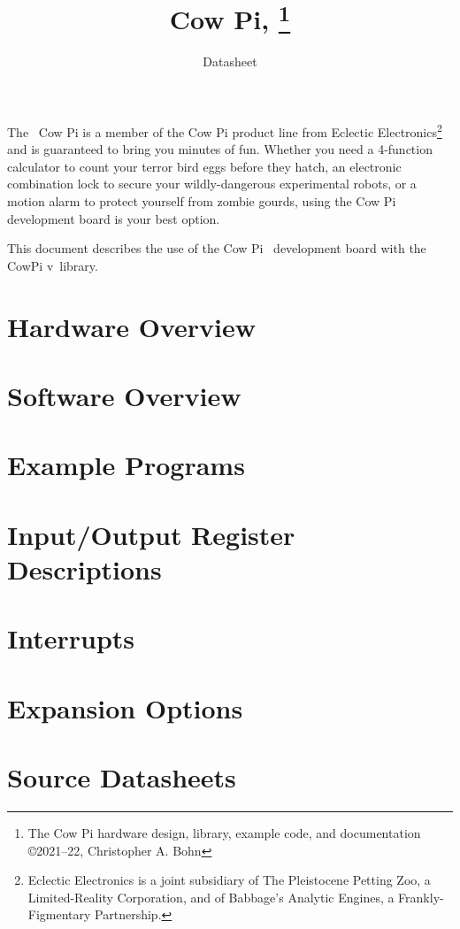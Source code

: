 \documentclass[12pt]{article}
\begin{document}
    \pagestyle{fancy}
    \fancyhf{}
    \cfoot{\thepage}
    \title{Cow Pi, \hardwareversion\footnote{The Cow Pi hardware design, library, example code, and documentation \copyright 2021--22, Christopher A. Bohn}}
    \author{Datasheet}
    \date{}
    \maketitle

    The \hardwareversion\ Cow Pi is a member of the Cow Pi product line from Eclectic Electronics\footnote{Eclectic Electronics is a joint subsidiary of The Pleistocene Petting Zoo, a Limited-Reality Corporation, and of Babbage's Analytic Engines, a Frankly-Figmentary Partnership.} and is guaranteed to bring you minutes of fun.
    Whether you need a 4-function calculator to count your terror bird eggs before they hatch, an electronic combination lock to secure your wildly-dangerous experimental robots, or a motion alarm to protect yourself from zombie gourds, using the Cow Pi development board is your best option.

    This document describes the use of the Cow Pi \cowpiversion\ development board with the CowPi v\softwareversion\ library.

    \tableofcontents


    \section{Hardware Overview} 

    \section{Software Overview} 

    \section{Example Programs} 

    \section{Input/Output Register Descriptions} \label{sec:IOregisterDescriptions}

    \section{Interrupts} \label{sec:Interrupts}

    \section{Expansion Options}

    \appendix


    \section{Source Datasheets}
\end{document}
